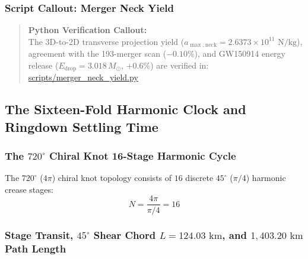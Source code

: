 \documentclass[11pt,a4paper]{article}
\begin{document}
\subsubsection{Script Callout: Merger Neck Yield}
\label{subsubsec:callout_neck}

\begin{quote}
\textbf{Python Verification Callout:}\\
The 3D-to-2D transverse projection yield ($a_{\max,\text{neck}} = 2.6373 \times 10^{11}\text{ N/kg}$), agreement with the 193-merger scan ($-0.10\%$), and GW150914 energy release ($E_{\text{drop}} = 3.018\,M_\odot$, $+0.6\%$) are verified in:\\
\url{scripts/merger_neck_yield.py}
\end{quote}

\subsection{The Sixteen-Fold Harmonic Clock and Ringdown Settling Time}
\label{subsec:sixteen_fold_clock}

\subsubsection{The $720^\circ$ Chiral Knot 16-Stage Harmonic Cycle}
\label{subsubsec:16stage_cycle}

The $720^\circ$ ($4\pi$) chiral knot topology consists of $16$ discrete $45^\circ$ ($\pi/4$) harmonic crease stages:
\begin{equation}
N = \frac{4\pi}{\pi/4} = 16
\end{equation}

\subsubsection{Stage Transit, $45^\circ$ Shear Chord $L = 124.03\text{ km}$, and $1,403.20\text{ km}$ Path Length}
\label{subsubsec:stage_transit}
\end{document}
